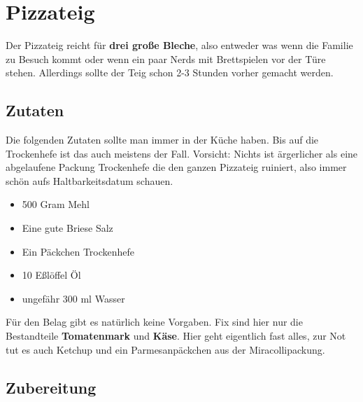 \documentclass[12pt, a4paper]{scrreprt}
\begin{document}
\thispagestyle{empty}

\chapter*{Pizzateig}

Der Pizzateig reicht für \textbf{drei große Bleche}, also entweder was wenn die Familie zu Besuch kommt oder wenn ein paar Nerds mit Brettspielen vor der Türe stehen. Allerdings sollte der Teig schon 2-3 Stunden vorher gemacht werden.

\section*{Zutaten}
Die folgenden Zutaten sollte man immer in der Küche haben. Bis auf die Trockenhefe ist das auch meistens der Fall. Vorsicht: Nichts ist ärgerlicher als eine abgelaufene Packung Trockenhefe die den ganzen Pizzateig ruiniert, also immer schön aufs Haltbarkeitsdatum schauen.

\begin{itemize}
  \item{500 Gram Mehl}
  \item{Eine gute Briese Salz}
  \item{Ein Päckchen Trockenhefe}
  \item{10 Eßlöffel Öl}
  \item{ungefähr 300 ml Wasser}
\end{itemize}

Für den Belag gibt es natürlich keine Vorgaben. Fix sind hier nur die Bestandteile \textbf{Tomatenmark} und \textbf{Käse}. Hier geht eigentlich fast alles, zur Not tut es auch Ketchup und ein Parmesanpäckchen aus der Miracollipackung.


\section*{Zubereitung}
\end{document}
